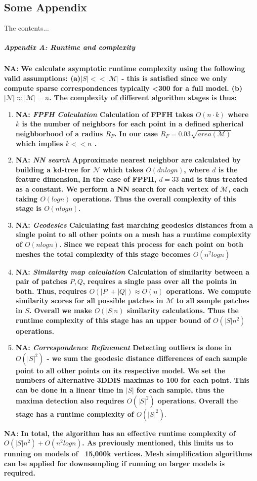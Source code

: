 \documentclass[10pt,twocolumn,letterpaper]{article}
\newcommand{\colornote}[3]{{\color{#1}\bf{#2: #3}\normalfont}}
\newcommand{\colornote}[3]{}
\newcommand {\nadav}[1]{\colornote{red}{NA}{#1}}
\begin{document}
{\small

}


\begin{appendices}
\chapter{Some Appendix}
The contents...
\end{appendices}
\paragraph{Appendix A: Runtime and complexity}
\label{app:Runtime}
\nadav{
	We calculate asymptotic runtime complexity using the following valid assumptions:
	(a)$|S|<<|\mathcal{M}|$ - this is satisfied since we only compute sparse correspondences typically <300 for a full model. 
	(b) $|\mathcal{N}|\approx |\mathcal{M}|=n$. 
	The complexity of different algorithm stages is thus:
}
\begin{enumerate}
	
	\item \nadav{\textit{FPFH Calculation} Calculation of FPFH takes $O(n \cdot k)$ where $k$ is the number of neighbors for each point in a defined spherical neighborhood of a radius $R_F$. In our case $R_F=0.03\sqrt{area(\mathcal{M})}$ which implies $k << n$ .
	}
	
	\item \nadav{\textit{NN search} Approximate nearest neighbor are calculated by building a kd-tree for $\mathcal{N}$ which takes $O(dnlogn)$, where $d$ is the feature dimension,
		In the case of FPFH, $d=33$ and is thus treated as a constant. 
		We perform a NN search for each vertex of $\mathcal{M}$, each taking $O(logn)$ operations. 
		Thus the overall complexity of this stage is $O(nlogn)$.}
	
	\item \nadav{\textit{Geodesics} Calculating fast marching geodesics distances from a single point to all other points on a mesh has a runtime complexity of $O(nlogn)$.
		Since we repeat this process for each point on both meshes the total complexity of this stage becomes $O(n^2logn)$}
	
	\item \nadav{\textit{Similarity map calculation} Calculation of similarity between a pair of patches $P,Q$, requires a single pass over all the points in both. 
		Thus, requires $O(|P|+|Q|)\approx O(n)$ operations. 
		We compute  similarity scores for all possible patches in $\mathcal{M}$ to all sample patches in $S$. 
		Overall we make $O(|S|n)$ similarity calculations. 
		Thus the runtime complexity of this stage has an upper bound of $O(|S|n^2)$ operations.}
	
	\item \nadav{\textit{Correspondence Refinement} 
		Detecting outliers is done in $O(|S|^2)$ - we sum the geodesic distance differences of each sample point to all other points on its respective model. 
		We set the numbers of alternative 3DDIS maximas to 100 for each point. This can be done in a linear time in $|S|$ for each sample, thus the maxima detection also requires $O(|S|^2)$ operations.
		Overall the stage has a runtime complexity of $O(|S|^2)$}.
	
\end{enumerate}
\nadav{In total, the algorithm has an effective runtime complexity of $O(|S|n^2) + O(n^2logn)$.
	As previously mentioned, this limits us to running on models of ~15,000k vertices. 
	Mesh simplification algorithms can be applied for downsampling if running on larger models is required.}
\end{document}
